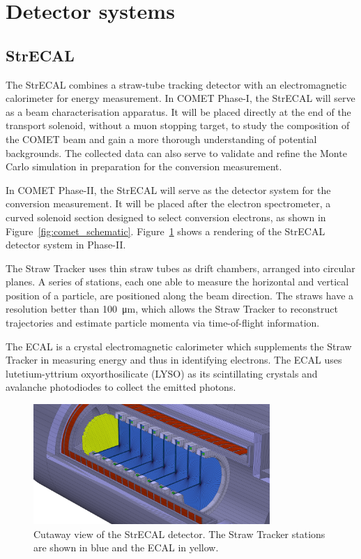 \section{Detector systems}
\subsection{StrECAL}
The StrECAL combines a straw-tube tracking detector with an electromagnetic
calorimeter for energy measurement. In COMET Phase-I, the StrECAL will serve as
a beam characterisation apparatus. It will be placed directly at the end of the
transport solenoid, without a muon stopping target, to study the composition of
the COMET beam and gain a more thorough understanding of potential backgrounds.
The collected data can also serve to validate and refine the Monte Carlo
simulation in preparation for the conversion measurement.

In COMET Phase-II, the StrECAL will serve as the detector system for the
conversion measurement. It will be placed after the electron spectrometer, a
curved solenoid section designed to select conversion electrons, as shown in
Figure~\ref{fig:comet_schematic}. Figure~\ref{fig:strecal} shows a rendering of
the StrECAL detector system in Phase-II.

The Straw Tracker uses thin straw tubes as drift chambers, arranged into
circular planes. A series of stations, each one able to measure the horizontal
and vertical position of a particle, are positioned along the beam direction.
The straws have a resolution better than \SI{100}{\um}, which allows the Straw
Tracker to reconstruct trajectories and estimate particle momenta via
time-of-flight information.

The ECAL is a crystal electromagnetic calorimeter which supplements the Straw
Tracker in measuring energy and thus in identifying electrons. The ECAL uses
lutetium-yttrium oxyorthosilicate (LYSO) as its scintillating crystals and
avalanche photodiodes to collect the emitted photons.


\begin{figure}
    \centering
    \includegraphics[width=0.8\textwidth]{chapter2/strecal_recolor.png}
    \caption{ Cutaway view of the StrECAL detector. The Straw Tracker stations
    are shown in blue and the ECAL in yellow.  }
    \label{fig:strecal}
\end{figure}

